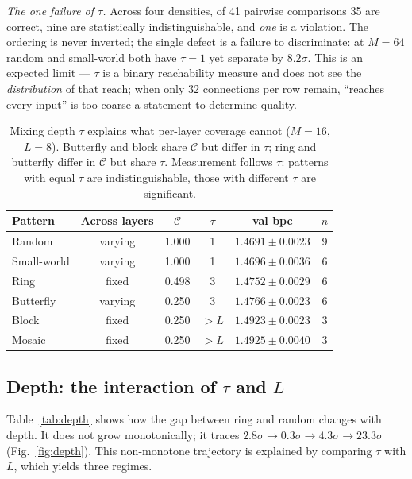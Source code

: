 \documentclass[10pt,journal]{IEEEtran}
\begin{document}
\emph{The one failure of $\tau$.} Across four densities, of 41 pairwise comparisons 35 are
correct, nine are statistically indistinguishable, and \emph{one} is a violation. The ordering
is never inverted; the single defect is a failure to discriminate: at $M{=}64$ random and
small-world both have $\tau{=}1$ yet separate by $8.2\sigma$. This is an expected limit ---
$\tau$ is a binary reachability measure and does not see the \emph{distribution} of that reach;
when only 32 connections per row remain, ``reaches every input'' is too coarse a statement to
determine quality.

\begin{table}[!t]
\centering
\footnotesize
\caption{Mixing depth $\tau$ explains what per-layer coverage cannot ($M{=}16$, $L{=}8$).
Butterfly and block share $\mathcal{C}$ but differ in $\tau$; ring and butterfly differ in
$\mathcal{C}$ but share $\tau$. Measurement follows $\tau$: patterns with equal $\tau$ are
indistinguishable, those with different $\tau$ are significant.}
\label{tab:tau}
\begin{tabular}{@{}lccccc@{}}
\toprule
Pattern & Across layers & $\mathcal{C}$ & $\tau$ & val bpc & $n$ \\
\midrule
Random      & varying & 1.000 & 1     & $1.4691 \pm 0.0023$ & 9 \\
Small-world & varying & 1.000 & 1     & $1.4696 \pm 0.0036$ & 6 \\
\midrule
Ring        & fixed   & 0.498 & 3     & $1.4752 \pm 0.0029$ & 6 \\
Butterfly   & varying & 0.250 & 3     & $1.4766 \pm 0.0023$ & 6 \\
\midrule
Block       & fixed   & 0.250 & $>L$  & $1.4923 \pm 0.0023$ & 3 \\
Mosaic      & fixed   & 0.250 & $>L$  & $1.4925 \pm 0.0040$ & 3 \\
\bottomrule
\end{tabular}
\end{table}

\subsection{Depth: the interaction of $\tau$ and $L$}
Table~\ref{tab:depth} shows how the gap between ring and random changes with depth. It does not
grow monotonically; it traces $2.8\sigma \to 0.3\sigma \to 4.3\sigma \to 23.3\sigma$
(Fig.~\ref{fig:depth}). This non-monotone trajectory is explained by comparing $\tau$ with $L$,
which yields three regimes.
\end{document}
